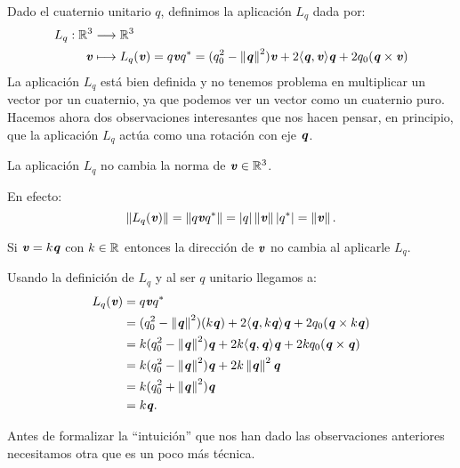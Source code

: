 		Dado el cuaternio unitario $ q $, definimos la aplicación $ L_q $ dada por:
		\begin{equation*}
			\begin{split}
			L_q:\mathbb{R}^3 &\longrightarrow \mathbb{R}^3 \\
			\textbf{\emph{v}} &\longmapsto L_q(\textbf{\emph{v}}) = q\textbf{\emph{v}} q^* =(q_0^2-\left\Vert\textbf{\emph{q}}\right\Vert^2)\textbf{\emph{v}} + 2\langle\textbf{\emph{q}} , \textbf{\emph{v}}\rangle \textbf{\emph{q}} + 2q_0(\textbf{\emph{q}} \times \textbf{\emph{v}})
			\end{split}
		\end{equation*} 
		La aplicación $ L_q $ está bien definida y no tenemos problema en multiplicar un vector por un cuaternio, ya que podemos ver un vector como un cuaternio puro. Hacemos ahora dos observaciones interesantes que nos hacen pensar, en principio, que la aplicación $ L_q $ actúa como una rotación con eje $ \textbf{\emph{q}} $.
	
		\bigskip
		\begin{observacion}
			La aplicación $ L_q $ no cambia la norma de $ \textbf{\emph{v}} \in \mathbb{R}^3 $.
		\end{observacion}
		En efecto:	
		\begin{equation*}
			\left\Vert L_q(\textbf{\emph{v}})\right\Vert = \left\Vert q\textbf{\emph{v}} q^*\right\Vert = \left\vert q\right\vert \left\Vert\textbf{\emph{v}}\right\Vert \left\vert q^*\right\vert = \left\Vert\textbf{\emph{v}}\right\Vert.
		\end{equation*}
		
		\begin{observacion}\label{NoCambiaEje}
			Si $ \textbf{\emph{v}} = k\textbf{\emph{q}} $ con $ k \in \mathbb{R} $ entonces la dirección de $ \textbf{\emph{v}} $ no cambia al aplicarle $ L_q $.
		\end{observacion}	
		Usando la definición de $ L_q $ y al ser $ q $ unitario llegamos a:
		\begin{equation*}
		\begin{split}
		L_q(\textbf{\emph{v}}) &= q \textbf{\emph{v}} q^* \\
		&= (q_0^2-\left\Vert\textbf{\emph{q}}\right\Vert^2)(k\textbf{\emph{q}}) + 2\langle\textbf{\emph{q}}, k\textbf{\emph{q}}\rangle\textbf{\emph{q}} + 2q_0(\textbf{\emph{q}} \times k\textbf{\emph{q}}) \\
		&= k(q_0^2-\left\Vert\textbf{\emph{q}}\right\Vert^2)\textbf{\emph{q}} + 2k\langle\textbf{\emph{q}}, \textbf{\emph{q}}\rangle\textbf{\emph{q}} + 2kq_0(\textbf{\emph{q}} \times \textbf{\emph{q}}) \\
		&= k(q_0^2-\left\Vert\textbf{\emph{q}}\right\Vert^2)\textbf{\emph{q}} + 2k\left\Vert\textbf{\emph{q}}\right\Vert^2\textbf{\emph{q}} \\
		&= k(q_0^2+\left\Vert\textbf{\emph{q}}\right\Vert^2)\textbf{\emph{q}} \\
		&= k\textbf{\emph{q}}.
		\end{split}
		\end{equation*}
		\bigskip
		
		Antes de formalizar la ``intuición'' que nos han dado las observaciones anteriores necesitamos otra que es un poco más técnica. 
	

